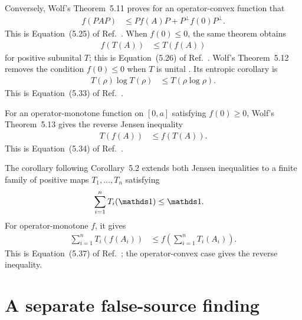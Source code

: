 \documentclass{article}
\begin{document}
Conversely, Wolf's Theorem~5.11 proves for an operator-convex function that
\begin{align}
    f(PAP)
        &\leq Pf(A)P+P^\perp f(0)P^\perp.
    \label{eq:wolf_ch5_operator_convexity_scope_source_projection_converse}
\end{align}
This is Equation~(5.25) of Ref.~\cite{Wolf2012Quantum}. When $f(0)\leq 0$, the
same theorem obtains
\begin{align}
    f(T(A))&\leq T(f(A))
    \label{eq:wolf_ch5_operator_convexity_scope_source_convex_jensen}
\end{align}
for positive subunital $T$; this is Equation~(5.26) of
Ref.~\cite{Wolf2012Quantum}. Wolf's Theorem~5.12 removes the condition
$f(0)\leq 0$ when $T$ is unital
\cite[Theorem~5.12]{Wolf2012Quantum}. Its entropic corollary is
\begin{align}
    T(\rho)\log T(\rho)
        &\leq T(\rho\log\rho).
    \label{eq:wolf_ch5_operator_convexity_scope_source_entropy_inequality}
\end{align}
This is Equation~(5.33) of Ref.~\cite{Wolf2012Quantum}.

For an operator-monotone function on $[0,a]$ satisfying $f(0)\geq 0$, Wolf's
Theorem~5.13 gives the reverse Jensen inequality
\begin{align}
    T(f(A))&\leq f(T(A)).
    \label{eq:wolf_ch5_operator_convexity_scope_source_monotone_jensen}
\end{align}
This is Equation~(5.34) of Ref.~\cite{Wolf2012Quantum}.

The corollary following Corollary~5.2 extends both Jensen inequalities to a
finite family of positive maps $T_1,\ldots,T_n$ satisfying
\begin{align}
    \sum_{i=1}^nT_i(\Id)&\leq\Id.
    \label{eq:wolf_ch5_operator_convexity_scope_finite_family_subunitality}
\end{align}
For operator-monotone $f$, it gives
\begin{align}
    \sum_{i=1}^nT_i(f(A_i))
        &\leq
        f\!\left(\sum_{i=1}^nT_i(A_i)\right).
    \label{eq:wolf_ch5_operator_convexity_scope_finite_family_monotone_jensen}
\end{align}
This is Equation~(5.37) of Ref.~\cite{Wolf2012Quantum}; the operator-convex
case gives the reverse inequality.

\section{A separate false-source finding}
\end{document}

